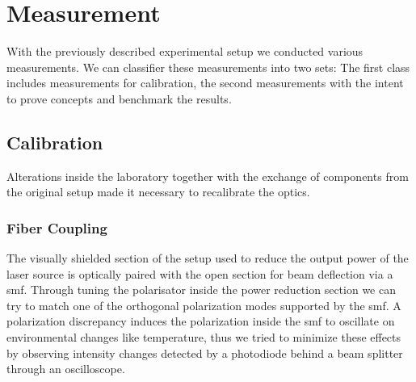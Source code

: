 \chapter{Measurement}

With the previously described experimental setup we conducted various
measurements. We can classifier these measurements into two sets: The first
class includes measurements for calibration, the second measurements with the
intent to prove concepts and benchmark the results.

\section{Calibration}

Alterations inside the laboratory together with the exchange of components
from the original setup made it necessary to recalibrate the optics.

\subsection{Fiber Coupling}

The visually shielded section of the setup used to reduce the output power
of the laser source is optically paired with the open section for beam
deflection via a \gls{smf}. Through tuning the polarisator inside the power
reduction section we can try to match one of the orthogonal polarization
modes supported by the \gls{smf}. A polarization discrepancy induces the
polarization inside the \gls{smf} to oscillate on environmental changes like
temperature, thus we tried to minimize these effects by observing intensity
changes detected by a photodiode behind a beam splitter through an
oscilloscope.
